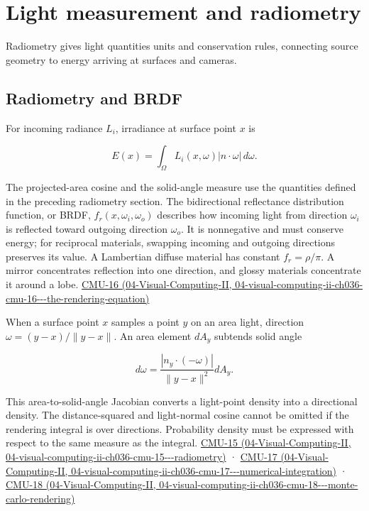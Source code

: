 \section{Light measurement and radiometry}\label{03-visual-computing-i-ch004-light-measurement-and-radiometry}

Radiometry gives light quantities units and conservation rules, connecting source geometry to energy arriving at surfaces and cameras.

\subsection{Radiometry and BRDF}\label{03-visual-computing-i-ch004-radiometry-and-brdf}

For incoming radiance \(L_i\), irradiance at surface point \(x\) is

\[
E(x)=\int_\Omega L_i(x,\omega)|n\cdot\omega|\,d\omega.
\]

The projected-area cosine and the solid-angle measure use the quantities defined in the preceding radiometry section. The bidirectional reflectance distribution function, or BRDF, \(f_r(x,\omega_i,\omega_o)\) describes how incoming light from direction \(\omega_i\) is reflected toward outgoing direction \(\omega_o\). It is nonnegative and must conserve energy; for reciprocal materials, swapping incoming and outgoing directions preserves its value. A Lambertian diffuse material has constant \(f_r=\rho/\pi\). A mirror concentrates reflection into one direction, and glossy materials concentrate it around a lobe. \href{../04-Visual-Computing-II/main.pdf\#nameddest=04-visual-computing-ii-ch036-cmu-16---the-rendering-equation}{CMU-16 (04-Visual-Computing-II, 04-visual-computing-ii-ch036-cmu-16-\/-\/-the-rendering-equation)}

When a surface point \(x\) samples a point \(y\) on an area light, direction \(\omega=(y-x)/\|y-x\|\). An area element \(dA_y\) subtends solid angle

\[
d\omega=\frac{|n_y\cdot(-\omega)|}{\|y-x\|^2}dA_y.
\]

This area-to-solid-angle Jacobian converts a light-point density into a directional density. The distance-squared and light-normal cosine cannot be omitted if the rendering integral is over directions. Probability density must be expressed with respect to the same measure as the integral. \href{../04-Visual-Computing-II/main.pdf\#nameddest=04-visual-computing-ii-ch036-cmu-15---radiometry}{CMU-15 (04-Visual-Computing-II, 04-visual-computing-ii-ch036-cmu-15-\/-\/-radiometry)} · \href{../04-Visual-Computing-II/main.pdf\#nameddest=04-visual-computing-ii-ch036-cmu-17---numerical-integration}{CMU-17 (04-Visual-Computing-II, 04-visual-computing-ii-ch036-cmu-17-\/-\/-numerical-integration)} · \href{../04-Visual-Computing-II/main.pdf\#nameddest=04-visual-computing-ii-ch036-cmu-18---monte-carlo-rendering}{CMU-18 (04-Visual-Computing-II, 04-visual-computing-ii-ch036-cmu-18-\/-\/-monte-carlo-rendering)}

